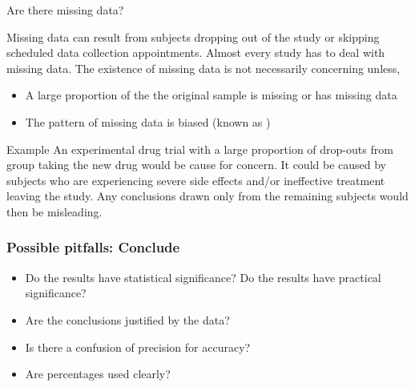\documentclass[xcolor=table, aspectratio=169, bigger]{beamer}
\begin{document}
\begin{frame}{Are there missing data?}

\begin{block}{}
Missing data can result from subjects dropping out of the study or skipping scheduled data collection appointments. Almost every study has to deal with missing data. The existence of missing data is not necessarily concerning unless,
\begin{itemize}
\item A large proportion of the the original sample is missing or has missing data
\item The pattern of missing data is biased (known as )
\end{itemize}
\end{block}

\pause
\begin{exampleblock}{Example}
An experimental drug trial with a large proportion of drop-outs from group taking the new drug would be cause for concern. It could be caused by subjects who are experiencing severe side effects and/or ineffective treatment leaving the study. Any conclusions drawn only from the remaining subjects would then be misleading.
\end{exampleblock}
\end{frame}


\begin{frame}
\frametitle{Possible pitfalls: Conclude}

\begin{block}{}
\begin{itemize}
\item Do the results have statistical significance? Do the results have practical significance?
\item Are the conclusions justified by the data?
\item Is there a confusion of precision for accuracy?
\item Are percentages used clearly?
\end{itemize}
\end{block}

\end{frame}
\end{document}
